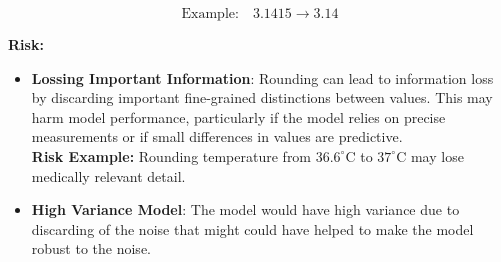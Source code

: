 \documentclass[a4paper,12pt]{article}
\begin{document}
\[
\text{Example:} \quad 3.1415 \rightarrow 3.14
\]

\textbf{Risk:} 
\begin{itemize}
    \item \textbf{Lossing Important Information}: Rounding can lead to information loss by discarding important fine-grained distinctions between values. This may harm model performance, particularly if the model relies on precise measurements or if small differences in values are predictive. \\ 
    \noindent \textbf{Risk Example:} Rounding temperature from $36.6^\circ\mathrm{C}$ to $37^\circ\mathrm{C}$ may lose medically relevant detail.
    
    \item \textbf{High Variance Model}: The model would have high variance due to discarding of the noise that might could have helped to make the model robust to the noise.
\end{itemize}
\end{document}

